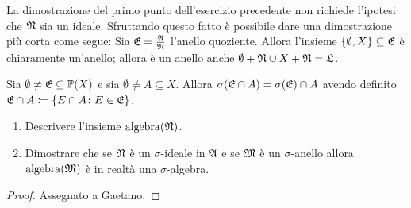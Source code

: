 \documentclass[../EserciziIstituzioniAnalisi.tex]{subfiles}
\begin{document}
\begin{remark}
  La dimostrazione del primo punto dell'esercizio precedente non richiede l'ipotesi che $\mathfrak N$ sia un ideale. Sfruttando questo fatto è possibile dare una dimostrazione più corta come segue:
  Sia $\mathfrak E=\frac{\mathfrak A}{\mathfrak N}$ l'anello quoziente. Allora l'insieme $\{\emptyset, X\}\subseteq\mathfrak E$ è chiaramente un'anello; allora è un anello anche $\emptyset+\mathfrak N \cup X+\mathfrak N=\mathfrak L$.
\end{remark}

\begin{exercise}[2016-10-13]
  Sia $\emptyset \neq \mathfrak E \subseteq \mathbb P(X)$ e sia $\emptyset \neq A \subseteq X$.
Allora $\sigma(\mathfrak E \cap A) = \sigma(\mathfrak E) \cap A$ avendo definito $\mathfrak E \cap A \coloneqq \left\lbrace E \cap A \colon E \in \mathfrak E\right\rbrace$.
\begin{enumerate}
\item Descrivere l'insieme $\operatorname{algebra}(\mathfrak N)$.
\item Dimostrare che se $\mathfrak N$ è un $\sigma$-ideale in $\mathfrak A$ e se $\mathfrak M$ è un $\sigma$-anello allora $\operatorname{algebra}(\mathfrak M)$ è in realtà una $\sigma$-algebra.
\end{enumerate}
\end{exercise}
\begin{proof}
Assegnato a Gaetano.
\end{proof}
\end{document}
